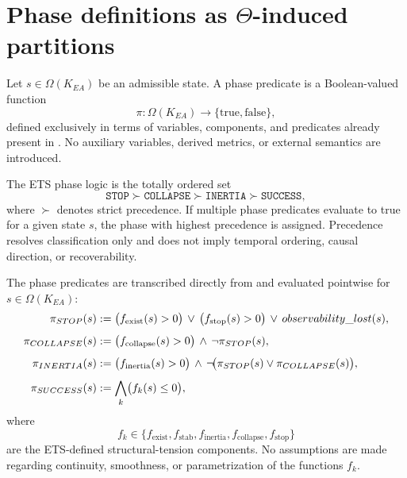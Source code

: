 ﻿\section{Phase definitions as \texorpdfstring{$\Theta$}{Theta}-induced partitions}
\label{sec:phases}

\begin{definition}
Let $s \in \Omega(K_{EA})$ be an admissible state. A phase predicate is a
Boolean-valued function
\[
\pi : \Omega(K_{EA}) \rightarrow \{\text{true}, \text{false}\},
\]
defined exclusively in terms of variables, components, and predicates already
present in . No auxiliary variables, derived metrics, or
external semantics are introduced.
\end{definition}

\begin{definition}
The ETS phase logic is the totally ordered set
\[
\texttt{STOP} \succ \texttt{COLLAPSE} \succ \texttt{INERTIA} \succ \texttt{SUCCESS},
\]
where $\succ$ denotes strict precedence. If multiple phase predicates evaluate
to true for a given state $s$, the phase with highest precedence is assigned.
Precedence resolves classification only and does not imply temporal ordering,
causal direction, or recoverability.
\end{definition}

\begin{definition}
The phase predicates are transcribed directly from
 and evaluated pointwise for
$s \in \Omega(K_{EA})$:
\begin{align}
\pi_{STOP}(s)
&:= \bigl(f_{\text{exist}}(s) > 0\bigr)
    \,\lor\, \bigl(f_{\text{stop}}(s) > 0\bigr)
    \,\lor\, observability\_lost(s),
    \label{eq:pi-stop} \\[4pt]
\pi_{COLLAPSE}(s)
&:= \bigl(f_{\text{collapse}}(s) > 0\bigr)
    \,\land\, \neg \pi_{STOP}(s),
    \label{eq:pi-collapse} \\[4pt]
\pi_{INERTIA}(s)
&:= \bigl(f_{\text{inertia}}(s) > 0\bigr)
    \,\land\, \neg\!\bigl(\pi_{STOP}(s)
                          \lor \pi_{COLLAPSE}(s)\bigr),
    \label{eq:pi-inertia} \\[4pt]
\pi_{SUCCESS}(s)
&:= \bigwedge_{k} \bigl(f_k(s) \le 0\bigr),
    \label{eq:pi-success}
\end{align}
where
\[
f_k \in \{f_{\text{exist}}, f_{\text{stab}}, f_{\text{inertia}},
          f_{\text{collapse}}, f_{\text{stop}}\}
\]
are the ETS-defined structural-tension components. No assumptions are made
regarding continuity, smoothness, or parametrization of the functions $f_k$.
\end{definition}

